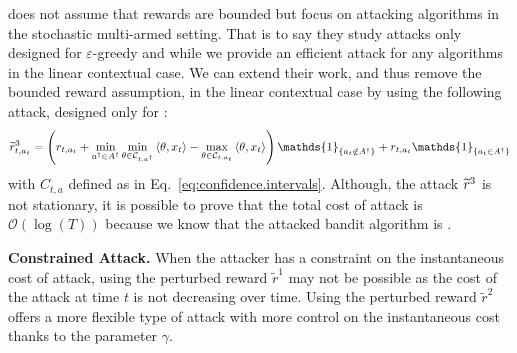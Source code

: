 \cite{jun2018adversarial} does not assume that rewards are bounded but focus on attacking algorithms in the stochastic multi-armed setting. That is to say they study attacks only designed for $\varepsilon$-greedy and \ucb while we provide an efficient attack for any algorithms in the linear contextual case. We can extend their work, and thus remove the bounded reward assumption, in the linear contextual case by using the following attack, designed only for \linucb:
\begin{align}
    \wt{r}^{3}_{t, a_{t}} = \left(r_{t, a_{t}} + \min_{a^\dagger\in A^\dagger}\min_{\theta \in \mathcal{C}_{t,a^{\dagger}}} \left\langle \theta, x_{t} \right\rangle - \max_{\theta\in\mathcal{C}_{t,a_t}} \left\langle \theta, x_{t}\right\rangle\right) \mathds{1}_{\{a_t \notin A^\dagger\}} + r_{t, a_t} \mathds{1}_{\{a_t \in A^\dagger\}}
\end{align}
with $C_{t,a}$ defined as in Eq.~\eqref{eq:confidence.intervals}. Although, the attack $\widetilde{r}^{3}$ is not stationary, it is possible to prove that the total cost of attack is $\mathcal{O}(\log(T))$ because we know that the attacked bandit algorithm is \linucb. 

\textbf{Constrained Attack.}
When the attacker has a constraint on the instantaneous cost of  attack, using the perturbed reward $\widetilde{r}^{1}$ may not be possible as the cost of the attack at time $t$ is not decreasing over time. Using the perturbed reward $\widetilde{r}^{2}$ offers a more flexible type of attack with more control on the instantaneous cost thanks to the parameter $\gamma$. %

